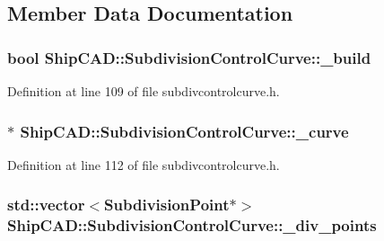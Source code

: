\subsection{Member Data Documentation}
\hypertarget{classShipCAD_1_1SubdivisionControlCurve_a1e4dd9968f46becb714e44709d0da418}{
\subsubsection[{\-\_\-build}]{\setlength{\rightskip}{0pt plus 5cm}bool Ship\-C\-A\-D\-::\-Subdivision\-Control\-Curve\-::\-\_\-build\hspace{0.3cm}{\ttfamily [protected]}}}\label{classShipCAD_1_1SubdivisionControlCurve_a1e4dd9968f46becb714e44709d0da418}


Definition at line 109 of file subdivcontrolcurve.\-h.

\hypertarget{classShipCAD_1_1SubdivisionControlCurve_a115a5b67ed81a3012ccb02a25b3d2c24}{
\subsubsection[{\-\_\-curve}]{$\ast$ Ship\-C\-A\-D\-::\-Subdivision\-Control\-Curve\-::\-\_\-curve\hspace{0.3cm}{\ttfamily [protected]}}}\label{classShipCAD_1_1SubdivisionControlCurve_a115a5b67ed81a3012ccb02a25b3d2c24}


Definition at line 112 of file subdivcontrolcurve.\-h.

\hypertarget{classShipCAD_1_1SubdivisionControlCurve_af91dbc96b703fe618567326cca21d82c}{
\subsubsection[{\-\_\-div\-\_\-points}]{\setlength{\rightskip}{0pt plus 5cm}std\-::vector$<${\bf Subdivision\-Point}$\ast$$>$ Ship\-C\-A\-D\-::\-Subdivision\-Control\-Curve\-::\-\_\-div\-\_\-points\hspace{0.3cm}{\ttfamily [protected]}}}\label{classShipCAD_1_1SubdivisionControlCurve_af91dbc96b703fe618567326cca21d82c}


